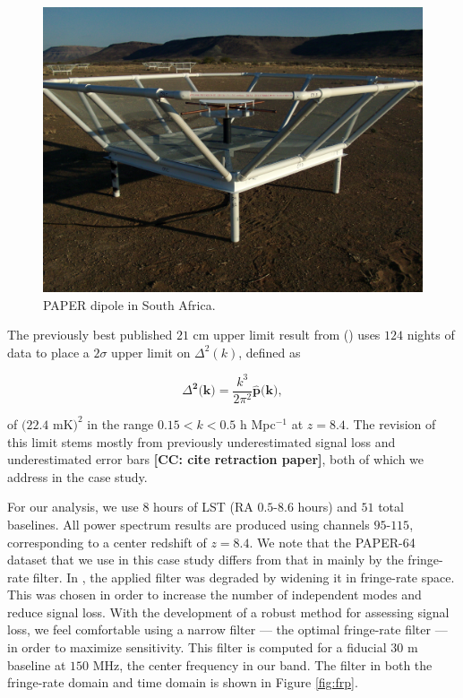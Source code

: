 \documentclass[preprint2,numberedappendix,tighten]{aastex6}  %
\newcommand{\cc}[1]{{\color{purple} \textbf{[CC: #1]}}}
\begin{document}
\begin{figure}
	\centering
	\includegraphics[trim={0.3cm 0.3cm 0.3cm 0.3cm},width=\columnwidth]{plots/paper_dipole.png}
	\caption{PAPER dipole in South Africa.}
	\label{fig:paper}
\end{figure}


The previously best published $21$ cm upper limit result from (\citealt{ali_et_al2015}) uses $124$ nights of data to place a $2\sigma$ upper limit on $\Delta^{2}(k)$, defined as

\begin{equation}
\Delta^{\textbf{2}}\textbf{(k)} = \frac{k^{3}}{2\pi^{2}}\hat{\textbf{p}}\textbf{(k)},
\end{equation}

\noindent of $(22.4$ mK$)^{2}$ in the range $0.15 < k < 0.5$ h Mpc$^{-1}$ at $z = 8.4$. The revision of this limit stems mostly from previously underestimated signal loss and underestimated error bars \cc{cite retraction paper}, both of which we address in the case study. 

For our analysis, we use $8$ hours of LST (RA $0.5$-$8.6$ hours) and $51$ total baselines. All power spectrum results are produced using channels $95$-$115$, corresponding to a center redshift of $z=8.4$. We note that the PAPER-64 dataset that we use in this case study differs from that in \citet{ali_et_al2015} mainly by the fringe-rate filter. In \citet{ali_et_al2015}, the applied filter was degraded by widening it in fringe-rate space. This was chosen in order to increase the number of independent modes and reduce signal loss. With the development of a robust method for assessing signal loss, we feel comfortable using a narrow filter --- the optimal fringe-rate filter --- in order to maximize sensitivity. This filter is computed for a fiducial $30$ m baseline at $150$ MHz, the center frequency in our band. The filter in both the fringe-rate domain and time domain is shown in Figure \ref{fig:frp}.
\end{document}
